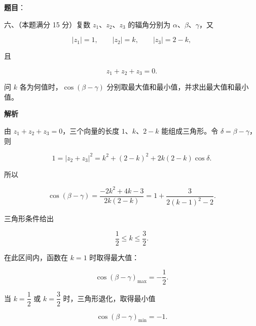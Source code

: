 \begin{answer}

\textbf{题目}：

六、（本题满分 15 分）复数 $z_1\text{、}z_2\text{、}z_3$ 的辐角分别为 $\alpha\text{、}\beta\text{、}\gamma$，又

\nopagebreak[4]
\[
|z_1|=1,\qquad |z_2|=k,\qquad |z_3|=2-k,
\]

且

\nopagebreak[4]
\[
z_1+z_2+z_3=0.
\]

问 $k$ 各为何值时，$\cos(\beta-\gamma)$ 分别取最大值和最小值，并求出最大值和最小值。

\textbf{解析}

由 $z_1+z_2+z_3=0$，三个向量的长度 $1\text{、}k\text{、}2-k$ 能组成三角形。令 $\delta=\beta-\gamma$，则

\nopagebreak[4]
\[
1=|z_2+z_3|^2
=k^2+(2-k)^2+2k(2-k)\cos\delta.
\]

所以

\nopagebreak[4]
\[
\cos(\beta-\gamma)
=\frac{-2k^2+4k-3}{2k(2-k)}
=1+\frac{3}{2(k-1)^2-2}.
\]

三角形条件给出

\nopagebreak[4]
\[
\frac12\le k\le\frac32.
\]

在此区间内，函数在 $k=1$ 时取得最大值：

\nopagebreak[4]
\[
\cos(\beta-\gamma)_{\max}=-\frac12.
\]

当 $k=\dfrac12$ 或 $k=\dfrac32$ 时，三角形退化，取得最小值

\nopagebreak[4]
\[
\cos(\beta-\gamma)_{\min}=-1.
\]


\end{answer}
